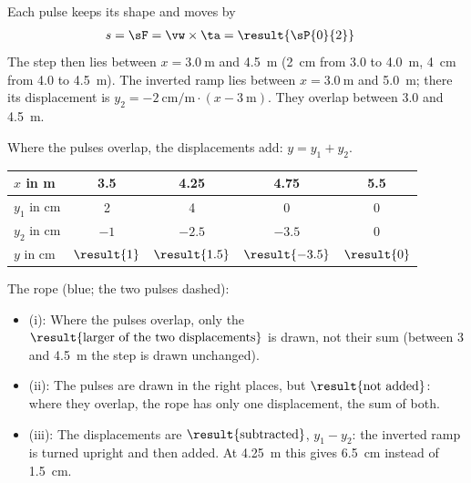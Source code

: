 \begin{abcliste}
\abc Each pulse keeps its shape and moves by
\begin{align}
 s &= \sF = \vw\times\ta = \result{\sP{0}{2}}
\end{align}
The step then lies between $x = \SI{3.0}{\m}$ and \SI{4.5}{\m} (\SI{2}{\cm} from 3.0 to \SI{4.0}{\m}, \SI{4}{\cm} from 4.0 to \SI{4.5}{\m}). The inverted ramp lies between $x = \SI{3.0}{\m}$ and \SI{5.0}{\m}; there its displacement is $y_2 = -\SI{2}{\cm\per\m}\cdot(x - \SI{3}{\m})$. They overlap between 3.0 and \SI{4.5}{\m}.

\abc Where the pulses overlap, the displacements add: $y = y_1 + y_2$.
\begin{center}
\begin{tabular}{lcccc}
 $x$ in \si{\m} & 3.5 & 4.25 & 4.75 & 5.5 \\ \hline
 $y_1$ in \si{\cm} & 2 & 4 & 0 & 0 \\
 $y_2$ in \si{\cm} & $-1$ & $-2.5$ & $-3.5$ & 0 \\
 $y$ in \si{\cm} & $\result{1}$ & $\result{1.5}$ & $\result{-3.5}$ & $\result{0}$
\end{tabular}
\end{center}
The rope (blue; the two pulses dashed):
\begin{center}
\end{center}

\abc
\begin{itemize}
\item (i): Where the pulses overlap, only the $\result{\text{larger of the two displacements}}$ is drawn, not their sum (between 3 and \SI{4.5}{\m} the step is drawn unchanged).
\item (ii): The pulses are drawn in the right places, but $\result{\text{not added}}$: where they overlap, the rope has only one displacement, the sum of both.
\item (iii): The displacements are $\result{\text{subtracted}}$, $y_1 - y_2$: the inverted ramp is turned upright and then added. At \SI{4.25}{\m} this gives \SI{6.5}{\cm} instead of \SI{1.5}{\cm}.
\end{itemize}
\end{abcliste}
